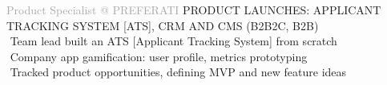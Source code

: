 \begin{cvtable}
% 
{\textcolor{darkgray}{%
Product Specialist \newline
@ {P\scriptsize REFERATI}
}}%
{}%
{%
    {\scriptsize PRODUCT LAUNCHES:
    APPLICANT TRACKING SYSTEM [ATS],
    CRM AND CMS
    (B2B2C, B2B)
    } \\
     \textperiodcentered $ $ Team lead built an ATS [Applicant Tracking System] from scratch \\
     \textperiodcentered $ $ Company app gamification: user profile, metrics prototyping \\
     \textperiodcentered $ $ Tracked product opportunities, defining MVP and new feature ideas \\
%
}


\end{cvtable}
